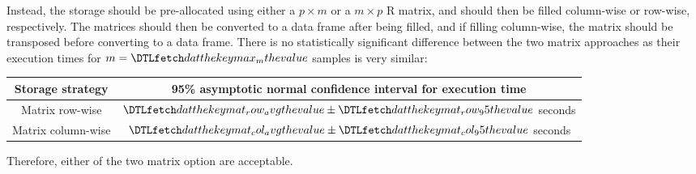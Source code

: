 \documentclass[12pt]{article}
\begin{document}
Instead, the storage should be pre-allocated using either a $p \times m$ or a $m \times p$ R matrix, and should then be filled
column-wise or row-wise, respectively. The matrices should then be converted to a data frame after being filled, and if filling column-wise, the matrix should be transposed before converting to a data frame.
There is no statistically significant difference between the two matrix approaches as their execution times for $m=\dat{max_m}$ samples
is very similar:
\begin{center}
    \begin{tabular}{c|c}
        \textbf{Storage strategy} & \textbf{95\% asymptotic normal confidence interval for execution time} \\
        \hline
        Matrix row-wise & $\dat{mat_row_avg}\pm\dat{mat_row_95}$ seconds \\
        Matrix column-wise & $\dat{mat_col_avg}\pm\dat{mat_col_95}$ seconds
    \end{tabular}
\end{center}

Therefore, either of the two matrix option are acceptable.
\end{document}
